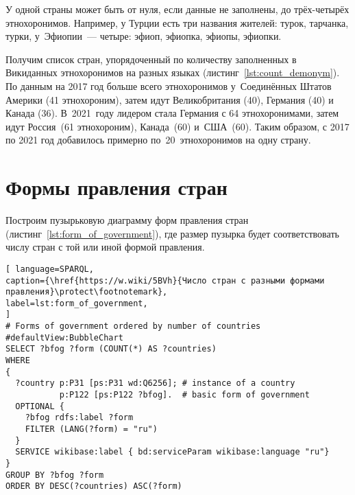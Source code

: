 У одной страны может быть от нуля, если данные не заполнены, до трёх-четырёх этнохоронимов. 
Например, у Турции есть три названия жителей: турок, тарчанка, турки, 
у~Эфиопии~--- четыре: эфиоп, эфиопка, эфиопы, эфиопки.

Получим список стран, упорядоченный по количеству заполненных в Викиданных этнохоронимов 
на разных языках (листинг~\ref{lst:count_demonym}). 
По данным на 2017 год больше всего этнохоронимов у~Соединённых Штатов Америки (41 этнохороним), 
затем идут Великобритания (40), 
Германия (40) и Канада (36). 
В~2021~году лидером стала Германия с 64 этнохоронимами, 
затем идут Россия~(61 этнохороним), Канада~(60) и~США~(60). 
Таким образом, с 2017 по 2021 год добавилось примерно по~20~этнохоронимов на одну страну.


\section{Формы правления стран}

Построим пузырьковую диаграмму форм правления стран (листинг~\ref{lst:form_of_government}), где размер пузырка будет соответствовать числу стран с той или иной формой правления.


\begin{lstlisting}[ language=SPARQL, 
caption={\href{https://w.wiki/5BVh}{Число стран с разными формами правления}\protect\footnotemark},
label=lst:form_of_government, 
]
# Forms of government ordered by number of countries
#defaultView:BubbleChart
SELECT ?bfog ?form (COUNT(*) AS ?countries)
WHERE 
{
  ?country p:P31 [ps:P31 wd:Q6256]; # instance of a country
           p:P122 [ps:P122 ?bfog].  # basic form of government
  OPTIONAL {
    ?bfog rdfs:label ?form
	FILTER (LANG(?form) = "ru")
  }
  SERVICE wikibase:label { bd:serviceParam wikibase:language "ru"}
}
GROUP BY ?bfog ?form
ORDER BY DESC(?countries) ASC(?form)
\end{lstlisting}



